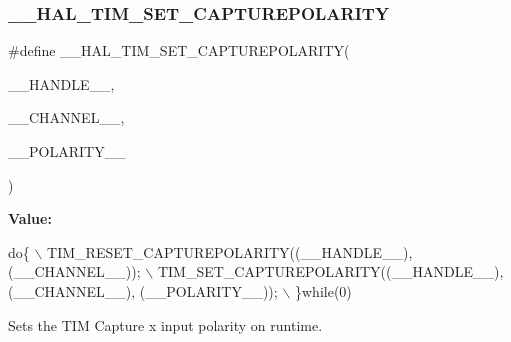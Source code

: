 \subsubsection{\texorpdfstring{\+\_\+\+\_\+\+H\+A\+L\+\_\+\+T\+I\+M\+\_\+\+S\+E\+T\+\_\+\+C\+A\+P\+T\+U\+R\+E\+P\+O\+L\+A\+R\+I\+TY}{\_\_HAL\_TIM\_SET\_CAPTUREPOLARITY}}
{\footnotesize\ttfamily \#define \+\_\+\+\_\+\+H\+A\+L\+\_\+\+T\+I\+M\+\_\+\+S\+E\+T\+\_\+\+C\+A\+P\+T\+U\+R\+E\+P\+O\+L\+A\+R\+I\+TY(\begin{DoxyParamCaption}\item[{}]{\+\_\+\+\_\+\+H\+A\+N\+D\+L\+E\+\_\+\+\_\+,  }\item[{}]{\+\_\+\+\_\+\+C\+H\+A\+N\+N\+E\+L\+\_\+\+\_\+,  }\item[{}]{\+\_\+\+\_\+\+P\+O\+L\+A\+R\+I\+T\+Y\+\_\+\+\_\+ }\end{DoxyParamCaption})}

{\bfseries Value\+:}
\begin{DoxyCode}
\textcolor{keywordflow}{do}\{                                                                     \(\backslash\)
          TIM\_RESET\_CAPTUREPOLARITY((\_\_HANDLE\_\_), (\_\_CHANNEL\_\_));               \(\backslash\)
          TIM\_SET\_CAPTUREPOLARITY((\_\_HANDLE\_\_), (\_\_CHANNEL\_\_), (\_\_POLARITY\_\_)); \(\backslash\)
        \}\textcolor{keywordflow}{while}(0)
\end{DoxyCode}


Sets the T\+IM Capture x input polarity on runtime. 


